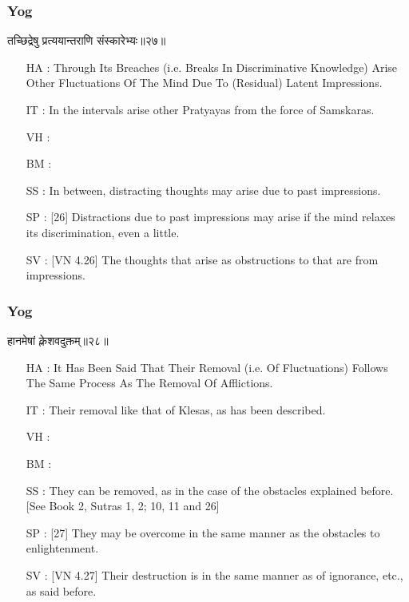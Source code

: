 \begin{frame}[fragile]\frametitle{Yog}
\begin{sanskrit}
तच्छिद्रेषु प्रत्ययान्तराणि संस्कारेभ्यः॥२७॥
\end{sanskrit}

	\begin{itemize}
	\item [HA]: Through Its Breaches (i.e. Breaks In Discriminative Knowledge) Arise Other Fluctuations Of The Mind Due To (Residual) Latent Impressions.
	\item [IT]: In the intervals arise other Pratyayas from the force of Samskaras.
	\item [VH]: 
	\item [BM]: 
	\item [SS]: In between, distracting thoughts may arise due to past impressions.
	\item [SP]: [26] Distractions due to past impressions may arise if the mind relaxes its discrimination, even a little.
	\item [SV]: [VN 4.26] The thoughts that arise as obstructions to that are from impressions. 
	\end{itemize}
\end{frame}



\begin{frame}[fragile]\frametitle{Yog}
\begin{sanskrit}
हानमेषां क्लेशवदुक्तम्॥२८॥
\end{sanskrit}

	\begin{itemize}
	\item [HA]: It Has Been Said That Their Removal (i.e. Of Fluctuations) Follows The Same Process As The Removal Of Afflictions.
	\item [IT]: Their removal like that of Klesas, as has been described.
	\item [VH]: 
	\item [BM]: 
	\item [SS]: They can be removed, as in the case of the obstacles explained before. [See Book 2, Sutras 1, 2; 10, 11 and 26]
	\item [SP]: [27] They may be overcome in the same manner as the obstacles to enlightenment.
	\item [SV]: [VN 4.27] Their destruction is in the same manner as of ignorance, etc., as said before. 
	\end{itemize}
\end{frame}

